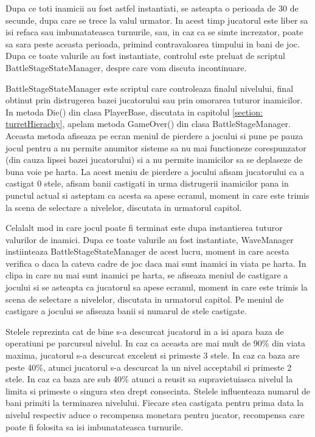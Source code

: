 \documentclass[12pt, a4paper]{article}
\begin{document}
	Dupa ce toti inamicii au fost astfel instantiati, se asteapta o perioada de 30 de secunde, dupa care se trece la valul urmator. In acest timp jucatorul este liber sa isi refaca sau imbunatateasca turnurile, sau, in caz ca se simte increzator, poate sa sara peste aceasta perioada, primind contravaloarea timpului in bani de joc. Dupa ce toate valurile au fost instantiate, controlul este preluat de scriptul BattleStageStateManager, despre care vom discuta incontinuare.
	\newline
	
	BattleStageStateManager este scriptul care controleaza finalul nivelului, final obtinut prin distrugerea bazei jucatorului sau prin omorarea tuturor inamicilor. In metoda Die() din clasa PlayerBase, discutata in capitolul \ref{section: turretHierachy}, apelam metoda GameOver() din clasa BattleStageManager. Aceasta metoda afiseaza pe ecran meniul de pierdere a jocului si pune pe pauza jocul pentru a nu permite anumitor sisteme sa nu mai functioneze corespunzator (din cauza lipsei bazei jucatorului) si a nu permite inamicilor sa se deplaseze de buna voie pe harta. La acest meniu de pierdere a jocului afisam jucatorului ca a castigat 0 stele, afisam banii castigati in urma distrugerii inamicilor pana in punctul actual si asteptam ca acesta sa apese ecranul, moment in care este trimis la scena de selectare a nivelelor, discutata in urmatorul capitol.
	\newline
	
	Celalalt mod in care jocul poate fi terminat este dupa instantierea tuturor valurilor de inamici. Dupa ce toate valurile au fost instantiate, WaveManager instiinteaza BattleStageStateManager de acest lucru, moment in care acesta verifica o daca la cateva cadre de joc daca mai sunt inamici in viata pe harta. In clipa in care nu mai sunt inamici pe harta, se afiseaza meniul de castigare a jocului si se asteapta ca jucatorul sa apese ecranul, moment in care este trimis la scena de selectare a nivelelor, discutata in urmatorul capitol. Pe meniul de castigare a jocului se afiseaza banii si numarul de stele castigate. 
	\newline
	
	Stelele reprezinta cat de bine s-a descurcat jucatorul in a isi apara baza de operatiuni pe parcursul nivelul. In caz ca aceasta are mai mult de 90\% din viata maxima, jucatorul s-a descurcat excelent si primeste 3 stele. In caz ca baza are peste 40\%, atunci jucatorul s-a descurcat la un nivel acceptabil si primeste 2 stele. In caz ca baza are sub 40\% atunci a reusit sa supravietuiasca nivelul la limita si primeste o singura stea drept consecinta. Stelele influenteaza numarul de bani primiti la terminarea nivelului. Fiecare stea castigata pentru prima data la nivelul respectiv aduce o recompensa monetara pentru jucator, recompensa care poate fi folosita sa isi imbunatateasca turnurile. 
	\newline
	
\end{document}
